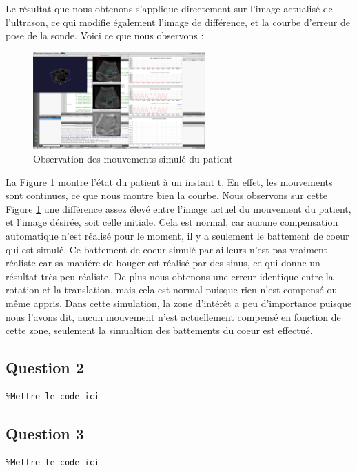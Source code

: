 \documentclass[a4paper,11pt]{article}
\begin{document}
Le r\'esultat que nous obtenons s'applique directement sur l'image actualis\'e de l'ultrason, ce qui modifie \'egalement l'image de diff\'erence, et la courbe d'erreur de pose de la sonde. Voici ce que nous observons :
\begin{figure}[h]
	\centering
		\includegraphics[width=250px]{./images/question1.png}
	\caption{Observation des mouvements simul\'e du patient}
	\label{mvtPatient}
\end{figure}

La Figure \ref{mvtPatient} montre l'\'etat du patient \`a un instant t. En effet, les mouvements sont continues, ce que nous montre bien la courbe. Nous observons sur cette Figure \ref{mvtPatient} une diff\'erence assez \'elev\'e entre l'image actuel du mouvement du patient, et l'image d\'esir\'ee, soit celle initiale. Cela est normal, car aucune compensation automatique n'est r\'ealis\'e pour le moment, il y a seulement le battement de coeur qui est simul\'e. Ce battement de coeur simul\'e par ailleurs n'est pas vraiment r\'ealiste car sa mani\'ere de bouger est r\'ealis\'e par des sinus, ce qui donne un r\'esultat tr\`es peu r\'ealiste. De plus nous obtenons une erreur identique entre la rotation et la translation, mais cela est normal puisque rien n'est compens\'e ou m\^eme appris.
Dans cette simulation, la zone d'int\'er\^et a peu d'importance puisque nous l'avons dit, aucun mouvement n'est actuellement compens\'e en fonction de cette zone, seulement la simualtion des battements du coeur est effectu\'e.

\subsection{Question 2}
\begin{verbatim}
%Mettre le code ici
\end{verbatim}

\subsection{Question 3}
\begin{verbatim}
%Mettre le code ici
\end{verbatim}
\end{document}
